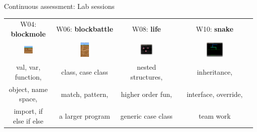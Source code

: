 \documentclass[aspectratio=169]{beamer}
\newenvironment{Slide}[1]%
  {\begin{frame}[environment=Slide]{#1}}
  {\end{frame}}%
\begin{document}
  


\begin{Slide}{Continuous assessment: Lab sessions}
  \begin{tabular}{c c c c}
    W04: \textbf{blockmole} & W06: \textbf{blockbattle} & W08: \textbf{life} & W10: \textbf{snake} \\
  \includegraphics[width=0.2\textwidth]{Pictures/blockmole} &
  \includegraphics[width=0.15\textwidth]{Pictures/blockbattle} &
  \includegraphics[width=0.27\textwidth]{Pictures/life} &
  \includegraphics[width=0.25\textwidth]{Pictures/snake} 
  \\
  \small val, var, function, & \small class, case class & \small nested structures, & \small inheritance, \\
  \small object, name space, & \small match, pattern, & \small higher order fun, & \small interface, override, \\
  \small import, if else if else & \small a larger program & \small generic case class & \small team work\\
\end{tabular}%
\end{Slide}  

\end{document}
